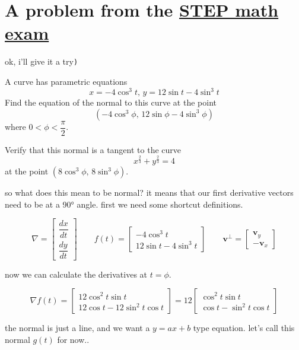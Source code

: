 \documentclass{article}
\begin{document}
  \section{A problem from the \href{https://pmt.physicsandmathstutor.com/download/Admissions/STEP/Papers/2021 STEP 3.pdf}{STEP math exam}}

  ok, i'll give it a try\texttt{)}

  \begin{centerframebox}
    A curve has parametric equations
    \[x = -4 \cos^3 t,\, y = 12 \sin t - 4 \sin^3 t\]
    Find the equation of the normal to this curve at the point
    \[(-4 \cos^3 \phi,\, 12 \sin \phi - 4 \sin^3 \phi)\]
    where $0 <\phi< \dfrac{\pi}{2}$.

    Verify that this normal is a tangent to the curve
    \[x^\frac{2}{3} + y^\frac{2}{3} = 4\]
    at the point $(8 \cos^3 \phi,\, 8 \sin^3 \phi)$.
  \end{centerframebox}

  so what does this mean to be normal? it means that our first derivative vectors need to be at a 90° angle. first we need some shortcut definitions.

  \[
    \nabla = \begin{bmatrix}\dfrac{dx}{dt} \\[4mm]\dfrac{dy}{dt}\end{bmatrix} \qquad
    f(t) = \begin{bmatrix}-4\cos^3t\\12\sin t-4\sin^3t\end{bmatrix} \qquad
    \mathbf{v}^\perp = \begin{bmatrix}\mathbf{v}_y \\ -\mathbf{v}_x\end{bmatrix}
  \]

  now we can calculate the derivatives at $t = \phi$.

  \[
    \nabla f(t) = \begin{bmatrix}
      12\cos^2t \sin t \\
      12\cos t - 12\sin^2t\cos t
    \end{bmatrix} = 12\begin{bmatrix}
      \cos^2t \sin t \\
      \cos t - \sin^2t\cos t
    \end{bmatrix}
  \]

  the normal is just a line, and we want a $y=ax+b$ type equation. let's call this normal $g(t)$ for now..
\end{document}
